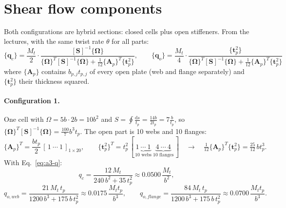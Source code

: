 
\section{Shear flow components}
\label{sec:a3-3}

Both configurations are hybrid sections: closed cells plus open stiffeners. From the lectures, with the same twist rate $\theta$ for all parts:
\begin{equation}
  \{\mathbf{q}_c\} = \frac{M_t}{2}\cdot\frac{[\mathbf{S}]^{-1}\{\boldsymbol{\Omega}\}}{\{\boldsymbol{\Omega}\}^T[\mathbf{S}]^{-1}\{\boldsymbol{\Omega}\} + \frac{1}{12}\{\mathbf{A}_p\}^T\{\mathbf{t}_p^2\}},
  \qquad
  \{\mathbf{q}_o\} = \frac{M_t}{4}\cdot\frac{\{\mathbf{t}_p^2\}}{\{\boldsymbol{\Omega}\}^T[\mathbf{S}]^{-1}\{\boldsymbol{\Omega}\} + \frac{1}{12}\{\mathbf{A}_p\}^T\{\mathbf{t}_p^2\}}
  \label{eq:a3-q}
\end{equation}
where $\{\mathbf{A}_p\}$ contains $b_{p,j}t_{p,j}$ of every open plate (web and flange separately) and $\{\mathbf{t}_p^2\}$ their thickness squared.

\paragraph{Configuration 1.}
One cell with $\Omega = 5b\cdot2b = 10b^2$ and $S = \oint\frac{\mathrm{d}s}{t_p} = \frac{14b}{2t_p} = 7\frac{b}{t_p}$, so $\{\boldsymbol{\Omega}\}^T[\mathbf{S}]^{-1}\{\boldsymbol{\Omega}\} = \frac{100}{7}b^3t_p$.
The open part is 10 webs and 10 flanges:
\begin{equation*}
  \{\mathbf{A}_p\}^T = \frac{bt_p}{2}\,[\,1\ \cdots\ 1\,]_{1\times20}, \qquad
  \{\mathbf{t}_p^2\}^T = t_p^2\,[\,\underbrace{1\ \cdots\ 1}_{\text{10 webs}}\ \underbrace{4\ \cdots\ 4}_{\text{10 flanges}}\,]
  \quad\rightarrow\quad
  \tfrac{1}{12}\{\mathbf{A}_p\}^T\{\mathbf{t}_p^2\} = \tfrac{25}{12}\,bt_p^3 .
\end{equation*}
With Eq.~\eqref{eq:a3-q}:
\begin{equation}
  q_c = \frac{12\,M_t}{240\,b^2 + 35\,t_p^2} \approx 0.0500\,\frac{M_t}{b^2},
\end{equation}
\begin{equation}
  q_{o,web} = \frac{21\,M_t\,t_p}{1200\,b^3 + 175\,b\,t_p^2} \approx 0.0175\,\frac{M_tt_p}{b^3},
  \qquad
  q_{o,flange} = \frac{84\,M_t\,t_p}{1200\,b^3 + 175\,b\,t_p^2} \approx 0.0700\,\frac{M_tt_p}{b^3}.
\end{equation}

